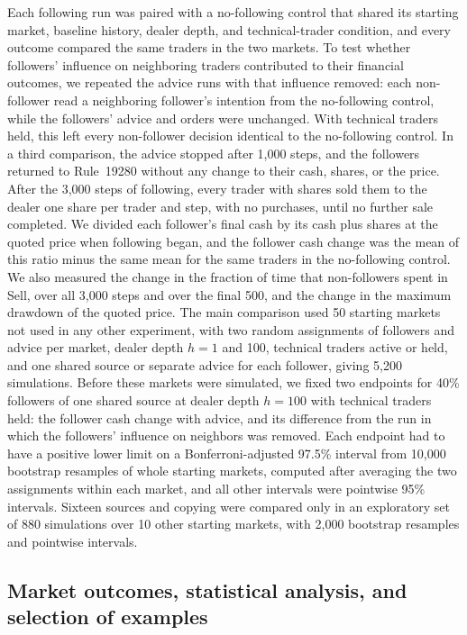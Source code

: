 Each following run was paired with a no-following control that shared
its starting market, baseline history, dealer depth, and technical-trader
condition, and every outcome compared the same traders in the two
markets. To test whether followers' influence on neighboring traders
contributed to their financial outcomes, we repeated the advice runs
with that influence removed: each non-follower read a neighboring
follower's intention from the no-following control, while the followers'
advice and orders were unchanged. With technical traders held, this
left every non-follower decision identical to the no-following control.
In a third comparison, the advice stopped after 1,000 steps, and the
followers returned to Rule~19280 without any change to their cash,
shares, or the price. After the 3,000 steps of following, every trader
with shares sold them to the dealer one share per trader and step, with
no purchases, until no further sale completed. We divided each
follower's final cash by its cash plus shares at the quoted price when
following began, and the follower cash change was the mean of this ratio
minus the same mean for the same traders in the no-following control. We
also measured the change in the fraction of time that non-followers
spent in Sell, over all 3,000 steps and over the final 500, and the
change in the maximum drawdown of the quoted price. The main comparison
used 50 starting markets not used in any other experiment, with two
random assignments of followers and advice per market, dealer depth
$h=1$ and 100, technical traders active or held, and one shared source or
separate advice for each follower, giving 5,200 simulations. Before these
markets were simulated, we fixed two endpoints for 40\% followers of one
shared source at dealer depth $h=100$ with technical traders held: the
follower cash change with advice, and its difference from the run in
which the followers' influence on neighbors was removed. Each endpoint
had to have a positive lower limit on a Bonferroni-adjusted 97.5\%
interval from 10,000 bootstrap resamples of whole starting markets,
computed after averaging the two assignments within each market, and
all other intervals were pointwise 95\% intervals. Sixteen sources and
copying were compared only in an exploratory set of 880 simulations over
10 other starting markets, with 2,000 bootstrap resamples and pointwise
intervals.

\subsection{Market outcomes, statistical analysis, and selection of examples}

